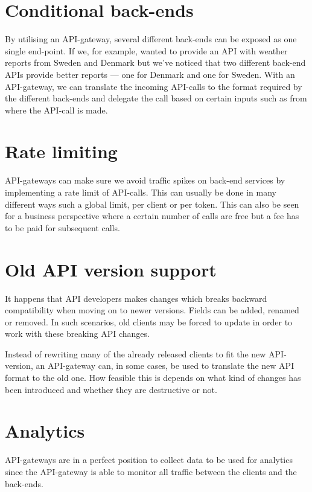 \documentclass{cslthse-msc}
\begin{document}
\section{Conditional back-ends}
By utilising an API-gateway, several different back-ends can be exposed as one single end-point. If we, for example, wanted to provide an API with weather reports from Sweden and Denmark but we've noticed that two different back-end APIs provide better reports --- one for Denmark and one for Sweden. With an API-gateway, we can translate the incoming API-calls to the format required by the different back-ends and delegate the call based on certain inputs such as from where the API-call is made.

\section{Rate limiting}
API-gateways can make sure we avoid traffic spikes on back-end services by implementing a rate limit of API-calls. This can usually be done in many different ways\cite{azure_rate_limit} such a global limit, per client or per token. This can also be seen for a business perspective where a certain number of calls are free but a fee has to be paid for subsequent calls.

\section{Old API version support}

It happens that API developers makes changes which breaks backward compatibility when moving on to newer versions. Fields can be added, renamed or removed. In such scenarios, old clients may be forced to update in order to work with these breaking API changes.

Instead of rewriting many of the already released clients to fit the new API-version, an API-gateway can, in some cases, be used to translate the new API format to the old one. How feasible this is depends on what kind of changes has been introduced and whether they are destructive or not.

\section{Analytics}

API-gateways are in a perfect position to collect data to be used for analytics since the API-gateway is able to monitor all traffic between the clients and the back-ends. 
\end{document}
